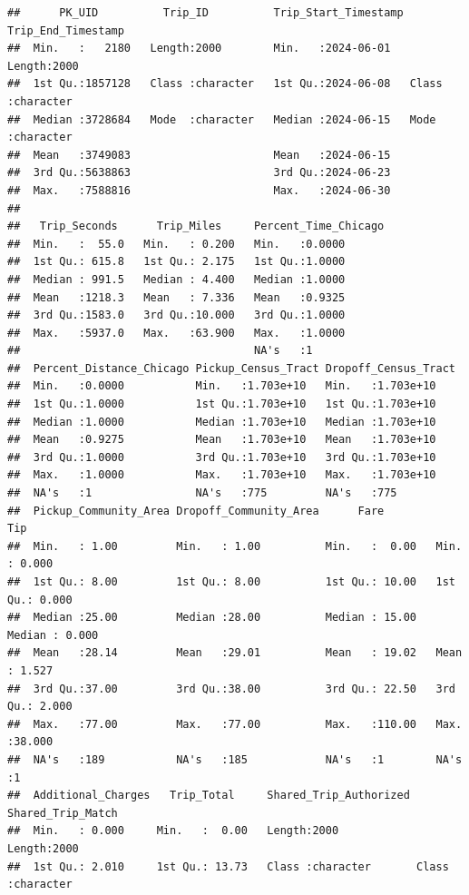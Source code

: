 \documentclass[
]{article}
\begin{document}
\begin{verbatim}
##      PK_UID          Trip_ID          Trip_Start_Timestamp Trip_End_Timestamp
##  Min.   :   2180   Length:2000        Min.   :2024-06-01   Length:2000       
##  1st Qu.:1857128   Class :character   1st Qu.:2024-06-08   Class :character  
##  Median :3728684   Mode  :character   Median :2024-06-15   Mode  :character  
##  Mean   :3749083                      Mean   :2024-06-15                     
##  3rd Qu.:5638863                      3rd Qu.:2024-06-23                     
##  Max.   :7588816                      Max.   :2024-06-30                     
##                                                                              
##   Trip_Seconds      Trip_Miles     Percent_Time_Chicago
##  Min.   :  55.0   Min.   : 0.200   Min.   :0.0000      
##  1st Qu.: 615.8   1st Qu.: 2.175   1st Qu.:1.0000      
##  Median : 991.5   Median : 4.400   Median :1.0000      
##  Mean   :1218.3   Mean   : 7.336   Mean   :0.9325      
##  3rd Qu.:1583.0   3rd Qu.:10.000   3rd Qu.:1.0000      
##  Max.   :5937.0   Max.   :63.900   Max.   :1.0000      
##                                    NA's   :1           
##  Percent_Distance_Chicago Pickup_Census_Tract Dropoff_Census_Tract
##  Min.   :0.0000           Min.   :1.703e+10   Min.   :1.703e+10   
##  1st Qu.:1.0000           1st Qu.:1.703e+10   1st Qu.:1.703e+10   
##  Median :1.0000           Median :1.703e+10   Median :1.703e+10   
##  Mean   :0.9275           Mean   :1.703e+10   Mean   :1.703e+10   
##  3rd Qu.:1.0000           3rd Qu.:1.703e+10   3rd Qu.:1.703e+10   
##  Max.   :1.0000           Max.   :1.703e+10   Max.   :1.703e+10   
##  NA's   :1                NA's   :775         NA's   :775         
##  Pickup_Community_Area Dropoff_Community_Area      Fare             Tip        
##  Min.   : 1.00         Min.   : 1.00          Min.   :  0.00   Min.   : 0.000  
##  1st Qu.: 8.00         1st Qu.: 8.00          1st Qu.: 10.00   1st Qu.: 0.000  
##  Median :25.00         Median :28.00          Median : 15.00   Median : 0.000  
##  Mean   :28.14         Mean   :29.01          Mean   : 19.02   Mean   : 1.527  
##  3rd Qu.:37.00         3rd Qu.:38.00          3rd Qu.: 22.50   3rd Qu.: 2.000  
##  Max.   :77.00         Max.   :77.00          Max.   :110.00   Max.   :38.000  
##  NA's   :189           NA's   :185            NA's   :1        NA's   :1       
##  Additional_Charges   Trip_Total     Shared_Trip_Authorized Shared_Trip_Match 
##  Min.   : 0.000     Min.   :  0.00   Length:2000            Length:2000       
##  1st Qu.: 2.010     1st Qu.: 13.73   Class :character       Class :character  

\end{verbatim}
\end{document}

